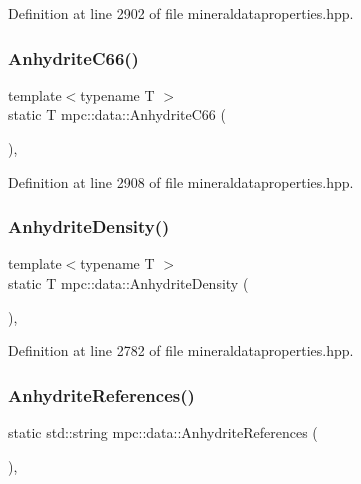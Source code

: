 Definition at line 2902 of file mineraldataproperties.\+hpp.

\mbox{\label{namespacempc_1_1data_a30eff05a8a6ddadbb053243665a74395}} 
\subsubsection{\texorpdfstring{Anhydrite\+C66()}{AnhydriteC66()}}
{\footnotesize\ttfamily template$<$typename T $>$ \\
static T mpc\+::data\+::\+Anhydrite\+C66 (\begin{DoxyParamCaption}{ }\end{DoxyParamCaption})\hspace{0.3cm}{\ttfamily [inline]}, {\ttfamily [static]}}



Definition at line 2908 of file mineraldataproperties.\+hpp.

\mbox{\label{namespacempc_1_1data_a31601a808bf405923e686608708d3eaa}} 
\subsubsection{\texorpdfstring{Anhydrite\+Density()}{AnhydriteDensity()}}
{\footnotesize\ttfamily template$<$typename T $>$ \\
static T mpc\+::data\+::\+Anhydrite\+Density (\begin{DoxyParamCaption}{ }\end{DoxyParamCaption})\hspace{0.3cm}{\ttfamily [inline]}, {\ttfamily [static]}}



Definition at line 2782 of file mineraldataproperties.\+hpp.

\mbox{\label{namespacempc_1_1data_a93b4437efd22e56d3b44e9589561ef38}} 
\subsubsection{\texorpdfstring{Anhydrite\+References()}{AnhydriteReferences()}}
{\footnotesize\ttfamily static std\+::string mpc\+::data\+::\+Anhydrite\+References (\begin{DoxyParamCaption}{ }\end{DoxyParamCaption})\hspace{0.3cm}{\ttfamily [inline]}, {\ttfamily [static]}}



